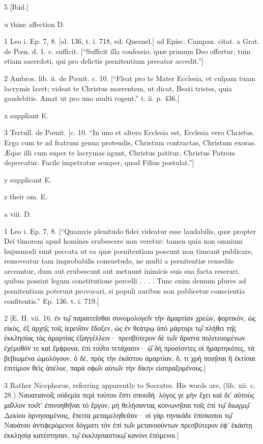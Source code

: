 5
[Ibid.]

u
thine affection D.

1
Leo i. Ep. 7, 8. [al. 136, t. i. 718, ed. Quesnel.] ad Episc. Campan. citat. a Grat. de Pœn. d. 1. c. sufficit. [“Sufficit illa confessio, quæ primum Deo offertur, tum etiam sacerdoti, qui pro delictis pœnitentium precator accedit.”]

2
Ambros. lib. ii. de Pœnit. c. 10. [“Fleat pro te Mater Ecclesia, et culpam tuam lacrymis lavet; videat te Christus mœrentem, ut dicat, Beati tristes, quia gaudebitis. Amat ut pro uno multi rogent.” t. ii. p. 436.]

x
suppliant E.

3
Tertull. de Pœnit. [c. 10. “In uno et altero Ecclesia est, Ecclesia vero Christus. Ergo cum te ad fratrum genua protendis, Christum contractas, Christum exoras. Æque illi cum super te lacrymas agunt, Christus patitur, Christus Patrem deprecatur. Facile impetratur semper, quod Filius postulat.”]

y
supplicant E.

z
their om. E.

a
viii. D.

1
Leo i. Ep. 7, 8. [“Quamvis plenitudo fidei videatur esse laudabilis, quæ propter Dei timorem apud homines erubescere non veretur: tamen quia non omnium hujusmodi sunt peccata ut ea quæ pœnitentiam poscunt non timeant publicare, removeatur tam improbabilis consuetudo, ne multi a pœnitentiæ remediis arceantur, dum aut erubescunt aut metuunt inimicis suis sua facta reserari, quibus possint legum constitutione percelli . . . . Tunc enim demum plures ad pœnitentiam poterunt provocari, si populi auribus non publicetur conscientia confitentis.” Ep. 136. t. i. 719.]

2
[E. H. vii. 16. ἐν τῳ̑ παραιτει̑σθαι συνομολογει̑ν τὴν ἁμαρτίαν χρεὼν, ϕορτικὸν, ὡς εἰκὸς, ἐξ ἀρχη̑ς τοι̑ς ἱερευ̑σιν ἔδοξεν, ὡς ἐν θεάτρῳ ὑπὸ μάρτυρι τῳ̑ πλήθει τη̑ς ἐκκλησίας τὰς ἁμαρτίας ἐξαγγέλλειν· πρεσβύτερον δὲ τω̑ν ἄριστα πολιτευομένων ἐχέμυθόν τε καὶ ἔμϕρονα, ἐπὶ του̑το τετάχασιν· ᾠ̑ δὴ προσίοντες οἱ ἡμαρτηκότες, τὰ βεβιωμένα ὡμολόγουν. ὁ δὲ, πρὸς τὴν ἑκάστου ἁμαρτίαν, ὅ, τι χρὴ ποιη̑σαι ἢ ἐκτίσαι ἐπιτίμιον θεὶς ἀπέλυε, παρὰ σϕω̑ν αὐτω̑ν τὴν δίκην εἰσπραξομένους.]

3
Rather Nicephorus, referring apparently to Socrates. His words are, (lib. xii. c. 28.) Ναυατιανοι̑ς οὐδεμία περὶ τούτου ἔστι σπουδή. λόγος γε μὴν ἔχει καὶ δι’ αὐτοὺς μα̑λλον του̑τ’ ἐπινοηθη̑ναι τὸ ἔργον, μὴ θελήσαντας κοινωνη̑σαι τοι̑ς ἐπὶ τῳ̑ διωγμῳ̑ Δεκίου ἀρνησαμένοις, ἔπειτα μεταμεληθει̑σιν· οἱ γὰρ τηνικάδε ἐπίσκοποι τῳ̑ Ναυάτου ἀντιϕερόμενοι δόγματι τὸν ἐπὶ τω̑ν μετανοούντων πρεσβύτερον ἐϕ’ ἑκάστῃ ἐκκλησίᾳ κατέστησαν, τῳ̑ ἐκκλησιαστικῳ̑ κανόνι ἑπόμενοι.]

